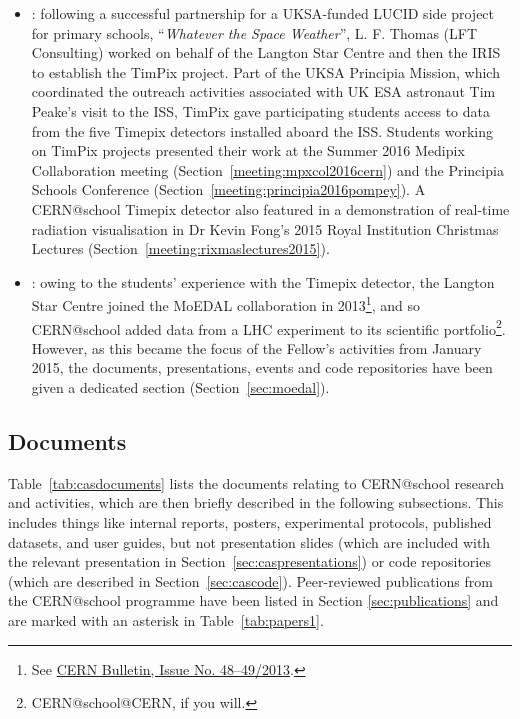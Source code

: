 \begin{itemize}
%
\item {}:
following a successful partnership for a \acs{UKSA}-funded
\acs{LUCID} side project for primary schools,
``{\em Whatever the Space Weather}'',
L. F. Thomas (LFT Consulting) worked on behalf of
the Langton Star Centre and then the \ac{IRIS} to establish the
TimPix project.
Part of the \ac{UKSA} Principia Mission,
which coordinated the outreach activities associated with
UK \ac{ESA} astronaut Tim Peake's visit to the \ac{ISS},
TimPix gave participating students access to data from the
five Timepix detectors installed aboard the \ac{ISS}.
Students working on TimPix projects presented their work
at the Summer 2016 Medipix Collaboration meeting (Section~\ref{meeting:mpxcol2016cern})
and the Principia Schools Conference (Section~\ref{meeting:principia2016pompey}).
A CERN@school Timepix detector also featured in a demonstration
of real-time radiation visualisation in Dr Kevin Fong's
2015 Royal Institution Christmas Lectures (Section~\ref{meeting:rixmaslectures2015}).
%
\item {}:
owing to the students' experience with the Timepix detector,
the Langton Star Centre joined the \ac{MoEDAL}
collaboration in 2013\footnote{%
See \href{https://cds.cern.ch/journal/CERNBulletin/2013/48/News Articles/1630194}{CERN Bulletin, Issue No. 48--49/2013}.},
and so CERN@school added data from a \acf{LHC} experiment
to its scientific portfolio\footnote{%
CERN@school@CERN, if you will.}.
However, as this became the focus of the Fellow's activities from
January 2015, the documents, presentations, events and code
repositories have been given a dedicated section
(Section~\ref{sec:moedal}).
\end{itemize}




\subsection{Documents}
\label{sec:casdocuments}
Table~\ref{tab:casdocuments} lists the documents relating to
CERN@school research and activities,
which are then briefly described in the following subsections.
%
This includes things like internal reports, posters, experimental protocols,
published datasets, and user guides, but not
presentation slides (which are included with the
relevant presentation in Section~\ref{sec:caspresentations})
or code repositories (which are described in Section~\ref{sec:cascode}).
%
Peer-reviewed publications from the CERN@school programme have been
listed in Section \ref{sec:publications} and are marked with an
asterisk in Table~\ref{tab:papers1}.

